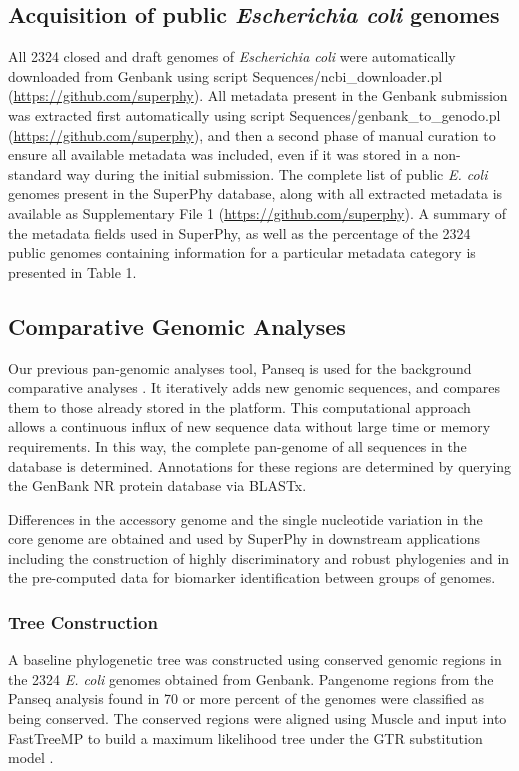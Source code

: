 \documentclass[doublespacing, linenumbers]{bmcart}
\begin{document}
\subsection{Acquisition of public \textit{Escherichia coli} genomes}
All 2324 closed and draft genomes of \textit{Escherichia coli} were automatically downloaded from Genbank using script Sequences/ncbi_downloader.pl (\url{https://github.com/superphy}). All metadata present in the Genbank submission was extracted first automatically using script Sequences/genbank_to_genodo.pl (\url{https://github.com/superphy}), and then a second phase of manual curation to ensure all available metadata was included, even if it was stored in a non-standard way during the initial submission. The complete list of public \textit{E. coli} genomes present in the SuperPhy database, along with all extracted metadata is available as Supplementary File 1 (\url{https://github.com/superphy}). A summary of the metadata fields used in SuperPhy, as well as the percentage of the 2324 public genomes containing information for a particular metadata category is presented in Table 1.

\subsection{Comparative Genomic Analyses}
Our previous pan-genomic analyses tool, Panseq is used for the background comparative analyses \cite{laing_pan-genome_2010}. It iteratively adds new genomic sequences, and compares them to those already stored in the platform. This computational approach allows a continuous influx of new sequence data without large time or memory requirements. In this way, the complete pan-genome of all sequences in the database is determined. Annotations for these regions are determined by querying the GenBank NR protein database via BLASTx.

Differences in the accessory genome and the single nucleotide variation in the core genome are obtained and used by SuperPhy in downstream applications including the construction of highly discriminatory and robust phylogenies and in the pre-computed data for biomarker identification between groups of genomes.

\subsubsection{Tree Construction}
A baseline phylogenetic tree was constructed using conserved genomic regions in the 2324 \textit{E. coli} genomes obtained from Genbank. Pangenome regions from the Panseq analysis found in 70 or more percent of the genomes were classified as being conserved. The conserved regions were aligned using Muscle \cite{edgar_muscle_2004,edgar_muscle_2004a} and input into FastTreeMP to build a maximum likelihood tree under the GTR substitution model \cite{price_fasttree_2010}. 
\end{document}
